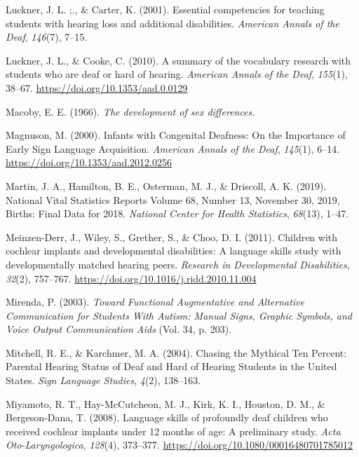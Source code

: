 \documentclass[english,man]{apa6}
\begin{document}
\leavevmode\hypertarget{ref-luckner2001}{}%
Luckner, J. L. ;., \& Carter, K. (2001). Essential competencies for teaching students with hearing loss and additional disabilities. \emph{American Annals of the Deaf}, \emph{146}(7), 7--15.

\leavevmode\hypertarget{ref-luckner2010}{}%
Luckner, J. L., \& Cooke, C. (2010). A summary of the vocabulary research with students who are deaf or hard of hearing. \emph{American Annals of the Deaf}, \emph{155}(1), 38--67. \url{https://doi.org/10.1353/aad.0.0129}

\leavevmode\hypertarget{ref-macoby1966}{}%
Macoby, E. E. (1966). \emph{The development of sex differences.}

\leavevmode\hypertarget{ref-magnuson2000}{}%
Magnuson, M. (2000). Infants with Congenital Deafness: On the Importance of Early Sign Language Acquisition. \emph{American Annals of the Deaf}, \emph{145}(1), 6--14. \url{https://doi.org/10.1353/aad.2012.0256}

\leavevmode\hypertarget{ref-martin2019}{}%
Martin, J. A., Hamilton, B. E., Osterman, M. J., \& Driscoll, A. K. (2019). National Vital Statistics Reports Volume 68, Number 13, November 30, 2019, Births: Final Data for 2018. \emph{National Center for Health Statistics}, \emph{68}(13), 1--47.

\leavevmode\hypertarget{ref-meinzen-derr2011}{}%
Meinzen-Derr, J., Wiley, S., Grether, S., \& Choo, D. I. (2011). Children with cochlear implants and developmental disabilities: A language skills study with developmentally matched hearing peers. \emph{Research in Developmental Disabilities}, \emph{32}(2), 757--767. \url{https://doi.org/10.1016/j.ridd.2010.11.004}

\leavevmode\hypertarget{ref-mirenda2003}{}%
Mirenda, P. (2003). \emph{Toward Functional Augmentative and Alternative Communication for Students With Autism: Manual Signs, Graphic Symbols, and Voice Output Communication Aids} (Vol. 34, p. 203).

\leavevmode\hypertarget{ref-mitchell2004}{}%
Mitchell, R. E., \& Karchmer, M. A. (2004). Chasing the Mythical Ten Percent: Parental Hearing Status of Deaf and Hard of Hearing Students in the United States. \emph{Sign Language Studies}, \emph{4}(2), 138--163.

\leavevmode\hypertarget{ref-miyamoto2008}{}%
Miyamoto, R. T., Hay-McCutcheon, M. J., Kirk, K. I., Houston, D. M., \& Bergeson-Dana, T. (2008). Language skills of profoundly deaf children who received cochlear implants under 12 months of age: A preliminary study. \emph{Acta Oto-Laryngologica}, \emph{128}(4), 373--377. \url{https://doi.org/10.1080/00016480701785012}
\end{document}
